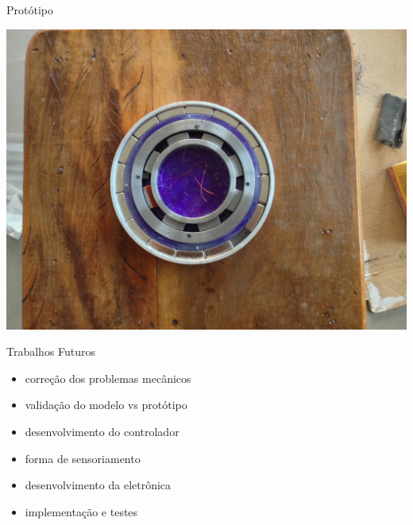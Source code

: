 \documentclass{beamer}
\begin{document}
\begin{frame}{Protótipo}
\begin{center}
\includegraphics[width=1\linewidth]{2}
\end{center}

\end{frame}

\begin{frame}{Trabalhos Futuros}
\begin{itemize}
	\item correção dos problemas mecânicos
	\item validação do modelo vs protótipo
	\item desenvolvimento do controlador
	\item forma de sensoriamento
	\item desenvolvimento da eletrônica
	\item implementação e testes
\end{itemize}
\end{frame}


\end{document}
